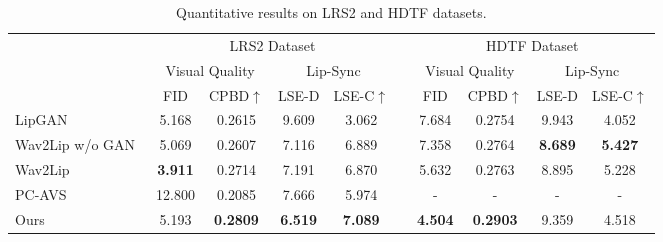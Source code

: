 \begin{table}[!htb]
\centering
\caption{Quantitative results on LRS2 and HDTF datasets.}
\setlength{\abovecaptionskip}{0.1cm}
\vspace{-1em}
\label{tab:quantitative}
\begin{tabular}{l |cccc c cccc}
\toprule
\multirow{3}{*}{}  & \multicolumn{4}{c}{LRS2 Dataset} & & \multicolumn{4}{c}{HDTF Dataset} \\
\cline{2-5} \cline{7-10}
& \multicolumn{2}{c}{Visual Quality} & \multicolumn{2}{c}{Lip-Sync} &  & \multicolumn{2}{c}{Visual Quality} & \multicolumn{2}{c}{Lip-Sync} \\
 & FID & CPBD$\uparrow$ & LSE-D & LSE-C$\uparrow$ &  & FID & CPBD$\uparrow$ & LSE-D & LSE-C$\uparrow$ \\
\hline
LipGAN~\cite{lipgan} &       5.168 & 0.2615 & 9.609 & 3.062 & & 7.684 & 0.2754  & 9.943 & 4.052 \\
Wav2Lip w/o GAN~\cite{wav2lip} &     5.069 & 0.2607 & 7.116 & 6.889 & & 7.358 & 0.2764 & \textbf{8.689} & \textbf{5.427} \\
Wav2Lip~\cite{wav2lip} &  \textbf{3.911} & 0.2714 & 7.191 & 6.870 & & 5.632 & 0.2763 & 8.895  & 5.228 \\
PC-AVS~\cite{pc-avs} &       12.800& 0.2085 & 7.666 & 5.974 & &-&-&-&- \\
Ours &                       5.193 & \textbf{0.2809} & \textbf{6.519} & \textbf{7.089} & & \textbf{4.504} & \textbf{0.2903} & 9.359  & 4.518 \\
\bottomrule
\end{tabular}
\vspace{-1em}
\end{table}